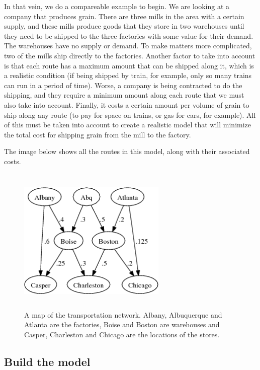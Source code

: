 \documentclass{article}
\begin{document}
In that vein, we do a compareable example to begin.  We are looking at a company that produces grain.  There are three mills in the area with a certain supply, and these mills produce goods that they store in two warehouses until they need to be shipped to the three factories with some value for their demand.  The warehouses have no supply or demand.  To make matters more complicated, two of the mills ship directly to the factories.  Another factor to take into account is that each route has a maximum amount that can be shipped along it, which is a realistic condition (if being shipped by train, for example, only so many trains can run in a period of time).  Worse, a company is being contracted to do the shipping, and they require a minimum amount along each route that we must also take into account.  Finally, it costs a certain amount per volume of grain to ship along any route (to pay for space on trains, or gas for cars, for example).  All of this must be taken into account to create a realistic model that will minimize the total cost for shipping grain from the mill to the factory.

The image below shows all the routes in this model, along with their associated costs.

\begin{figure}
\begin{center}
 \includegraphics[width=200pt,height=200pt]{NetworkFlow1-crop.png}
\end{center}
\caption{A map of the transportation network.  Albany, Albuquerque and Atlanta are the factories, Boise and Boston are warehouses and Casper, Charleston and Chicago are the locations of the stores.}
\end{figure} 

\subsection*{Build the model}
\end{document}
